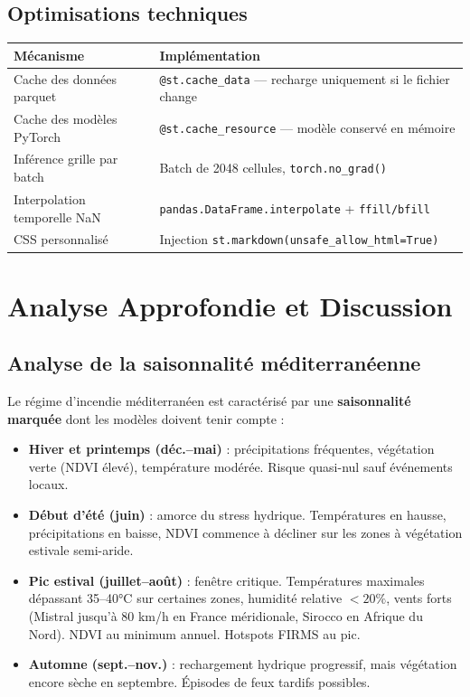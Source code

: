 \documentclass[12pt,a4paper]{report}
\begin{document}
\section{Optimisations techniques}

\begin{center}
\begin{tabular}{ll}
\toprule
\rowcolor{fireOrange!15}
\textbf{Mécanisme} & \textbf{Implémentation} \\
\midrule
Cache des données parquet     & \texttt{@st.cache\_data} — recharge uniquement si le fichier change \\
Cache des modèles PyTorch     & \texttt{@st.cache\_resource} — modèle conservé en mémoire \\
Inférence grille par batch    & Batch de 2048 cellules, \texttt{torch.no\_grad()} \\
Interpolation temporelle NaN  & \texttt{pandas.DataFrame.interpolate} + \texttt{ffill/bfill} \\
CSS personnalisé              & Injection \texttt{st.markdown(unsafe\_allow\_html=True)} \\
\bottomrule
\end{tabular}
\end{center}

\clearpage

\chapter{Analyse Approfondie et Discussion}
\label{chap:discussion}

\section{Analyse de la saisonnalité méditerranéenne}

Le régime d'incendie méditerranéen est caractérisé par une \textbf{saisonnalité marquée}
dont les modèles doivent tenir compte :

\begin{itemize}[leftmargin=*,itemsep=4pt]
  \item \textbf{Hiver et printemps (déc.–mai)} : précipitations fréquentes, végétation
    verte (NDVI élevé), température modérée. Risque quasi-nul sauf événements locaux.
  \item \textbf{Début d'été (juin)} : amorce du stress hydrique. Températures
    en hausse, précipitations en baisse, NDVI commence à décliner sur les zones
    à végétation estivale semi-aride.
  \item \textbf{Pic estival (juillet–août)} : fenêtre critique. Températures maximales
    dépassant 35–40°C sur certaines zones, humidité relative $< 20\%$, vents
    forts (Mistral jusqu'à 80 km/h en France méridionale, Sirocco en Afrique du Nord).
    NDVI au minimum annuel. Hotspots FIRMS au pic.
  \item \textbf{Automne (sept.–nov.)} : rechargement hydrique progressif, mais
    végétation encore sèche en septembre. Épisodes de feux tardifs possibles.
\end{itemize}
\end{document}
